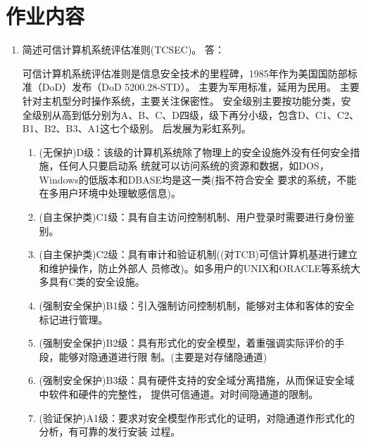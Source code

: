 \documentclass[degree=project,degree-type=project,cjk-font=noto]{thuthesis}
\begin{document}
\maketitle

\frontmatter
% 



\mainmatter

\chapter{作业内容}

\begin{enumerate}
  \setlength{\itemsep}{3\parskip}
  \item 简述可信计算机系统评估准则(TCSEC)。
  \newline
  {\heiti 答：}
  \newline

可信计算机系统评估准则是信息安全技术的里程碑，1985年作为美国国防部标准（DoD）发布（DoD 5200.28-STD）。
主要为军用标准，延用为民用。
主要针对主机型分时操作系统，主要关注保密性。
安全级别主要按功能分类，安全级别从高到低分别为A、B、C、D四级，级下再分小级，包含D、C1、C2、B1、B2、B3、A1这七个级别。
后发展为彩虹系列。

\begin{enumerate}
\item (无保护)D级：该级的计算机系统除了物理上的安全设施外没有任何安全措施，任何人只要启动系
统就可以访问系统的资源和数据，如DOS，Windows的低版本和DBASE均是这一类(指不符合安全
要求的系统，不能在多用户环境中处理敏感信息)。
\item (自主保护类)C1级：具有自主访问控制机制、用户登录时需要进行身份鉴别。
\item (自主保护类)C2级：具有审计和验证机制((对TCB)可信计算机基进行建立和维护操作，防止外部人
员修改)。如多用户的UNIX和ORACLE等系统大多具有C类的安全设施。
\item (强制安全保护)B1级：引入强制访问控制机制，能够对主体和客体的安全标记进行管理。
\item (强制安全保护)B2级：具有形式化的安全模型，着重强调实际评价的手段，能够对隐通道进行限
制。(主要是对存储隐通道)
\item (强制安全保护)B3级：具有硬件支持的安全域分离措施，从而保证安全域中软件和硬件的完整性，
提供可信通道。对时间隐通道的限制。
\item (验证保护)A1级：要求对安全模型作形式化的证明，对隐通道作形式化的分析，有可靠的发行安装
过程。
\end{enumerate}


\end{enumerate}
\end{document}
